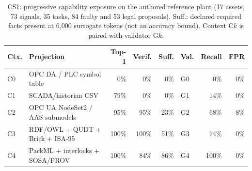 \begin{table}[t]
\centering\footnotesize
\setlength{\tabcolsep}{3pt}
\caption{CS1: progressive capability exposure on the authored reference plant (17 assets, 73 signals, 35 tasks, 84 faulty and 53 legal proposals). Suff.: declared required facts present at 6,000 surrogate tokens (not an accuracy bound). Context C$k$ is paired with validator G$k$.}
\label{tab:cs1}
\begin{tabular}{@{}llrrrlrr@{}}
\toprule
Ctx. & Projection & Top-1 & Verif. & Suff. & Val. & Recall & FPR \\
\midrule
C0 & OPC DA / PLC symbol table & 0\% & 0\% & 0\% & G0 & 0\% & 0\% \\
C1 & SCADA/historian CSV & 79\% & 0\% & 0\% & G1 & 14\% & 0\% \\
C2 & OPC UA NodeSet2 / AAS submodels & 95\% & 95\% & 23\% & G2 & 68\% & 8\% \\
C3 & RDF/OWL + QUDT + Brick + ISA-95 & 100\% & 100\% & 51\% & G3 & 74\% & 0\% \\
C4 & PackML + interlocks + SOSA/PROV & 100\% & 84\% & 86\% & G4 & 100\% & 0\% \\
\bottomrule
\end{tabular}
\end{table}
